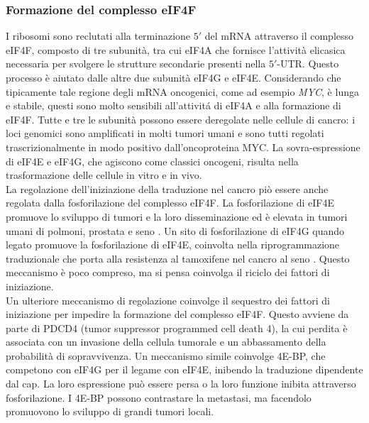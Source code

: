		\subsubsection{Formazione del complesso eIF4F}
		I ribosomi sono reclutati alla terminazione $5'$ del mRNA attraverso il complesso eIF4F, composto di tre subunit\`a, tra cui eIF4A che fornisce l'attivit\`a elicasica necessaria per svolgere le strutture secondarie presenti nella $5'$-UTR.
		Questo processo \`e aiutato dalle altre due subunit\`a eIF4G e eIF4E.
		Considerando che tipicamente tale regione degli mRNA oncogenici, come ad esempio \emph{MYC}, \`e lunga e stabile, questi sono molto sensibili all'attivit\'a di eIF4A e alla formazione di eIF4F.
		Tutte e tre le subunit\`a possono essere deregolate nelle cellule di cancro: i loci genomici sono amplificati in molti tumori umani e sono tutti regolati trascrizionalmente in modo positivo dall'oncoproteina MYC.
		La sovra-espressione di eIF4E e eIF4G, che agiscono come classici oncogeni, risulta nella trasformazione delle cellule in vitro e in vivo.\\
		La regolazione dell'iniziazione della traduzione nel cancro pi\`o essere anche regolata dalla fosforilazione del complesso eIF4F.
		La fosforilazione di eIF4E promuove lo sviluppo di tumori e la loro disseminazione ed \`e elevata in tumori umani di polmoni, prostata e seno \cite{fosforilazioneeif4e}.
		Un sito di fosforilazione di eIF4G quando legato promuove la fosforilazione di eIF4E, coinvolta nella riprogrammazione traduzionale che porta alla resistenza al tamoxifene nel cancro al seno \cite{tamoxifene}.
		Questo meccanismo \`e poco compreso, ma si pensa coinvolga il riciclo dei fattori di iniziazione.\\
		Un ulteriore meccanismo di regolazione coinvolge il sequestro dei fattori di iniziazione per impedire la formazione del complesso eIF4F.
		Questo avviene da parte di PDCD4 (tumor suppressor programmed cell death 4), la cui perdita \`e associata con un invasione della cellula tumorale e un abbassamento della probabilit\`a di sopravvivenza.
		Un meccanismo simile coinvolge 4E-BP, che competono con eIF4G per il legame con eIF4E, inibendo la traduzione dipendente dal cap.
		La loro espressione pu\`o essere persa o la loro funzione inibita attraverso fosforilazione.
		I 4E-BP possono contrastare la metastasi, ma facendolo promuovono lo sviluppo di grandi tumori locali.

